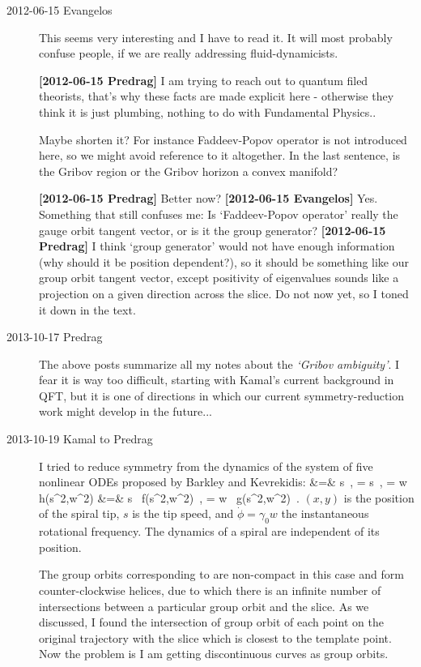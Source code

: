 \begin{description}
\item[2012-06-15 Evangelos]
This seems very interesting and I have to read it. It will most probably
confuse people, if we are really addressing fluid-dynamicists.

{\bf [2012-06-15 Predrag]} I am trying to reach out to quantum filed
theorists, that's why these facts are made explicit here - otherwise they
think it is just plumbing, nothing to do with Fundamental Physics..

Maybe shorten it? For instance Faddeev-Popov operator is not introduced
here, so we might avoid reference to it altogether. In the last sentence,
is the Gribov region or the Gribov horizon a convex manifold?

{\bf [2012-06-15 Predrag]} Better now? {\bf [2012-06-15 Evangelos]}  Yes.
Something that still confuses me: Is `Faddeev-Popov operator' really the
gauge orbit tangent vector, or is it the group generator? {\bf
[2012-06-15 Predrag]} I think `group generator' would not have enough
information (why should it be position dependent?), so it should be
something like our group orbit tangent vector, except positivity of
eigenvalues sounds like a projection on a given direction across the
slice. Do not now yet, so I toned it down in the text.

\item[2013-10-17 Predrag] The above posts summarize all my
notes about the \emph{`Gribov ambiguity'}. I fear it is way too difficult,
starting with Kamal's current background in QFT, but it is one of
directions in which our current symmetry-reduction work might
develop in the future...

\item[2013-10-19 Kamal to Predrag] I tried to reduce  symmetry
from the dynamics of the system of five nonlinear ODEs proposed by
Barkley and Kevrekidis:
\bea
{} &=& s \cos{\phi} \,,\qquad
{} = s \sin{\phi}\,,\qquad
\dot{\phi} =  w \, h(s^2,w^2)     \continue
{}  &=& s \, f(s^2,w^2) \,,\qquad
{}= w \, g(s^2,w^2)
\,.
\label{BarKev94-6}
\eea
$(x,y)$ is the position of the spiral tip, $s$ is the tip speed, and
$\dot{\phi}= \gamma_0 w$ the instantaneous rotational frequency. The
dynamics of a spiral are independent of its position.

The group orbits corresponding to  are non-compact in this
case and form counter-clockwise helices, due to which there is an
infinite number of intersections between a particular group orbit and
the slice. As we discussed, I found the intersection of group orbit
of each point on the original trajectory with the slice which is
closest to the template point. Now the problem is I am getting
discontinuous curves as group orbits.


\end{description}

